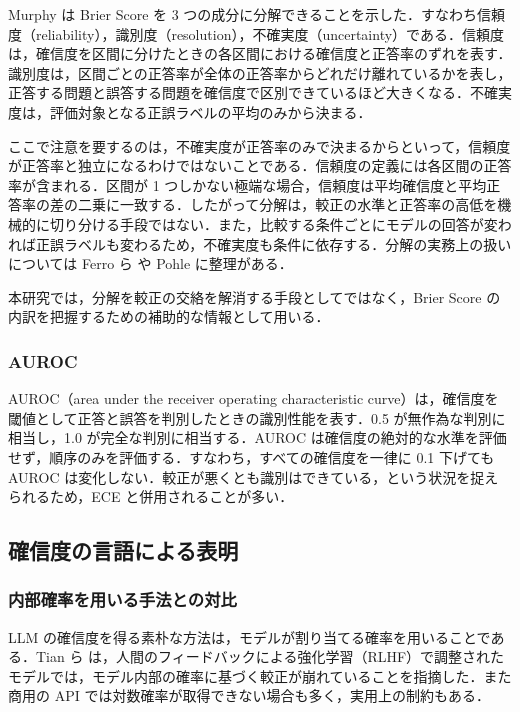 Murphy \cite{murphy1973partition} は Brier Score を 3 つの成分に分解できることを示した．すなわち信頼度（reliability），識別度（resolution），不確実度（uncertainty）である．信頼度は，確信度を区間に分けたときの各区間における確信度と正答率のずれを表す．識別度は，区間ごとの正答率が全体の正答率からどれだけ離れているかを表し，正答する問題と誤答する問題を確信度で区別できているほど大きくなる．不確実度は，評価対象となる正誤ラベルの平均のみから決まる．

ここで注意を要するのは，不確実度が正答率のみで決まるからといって，信頼度が正答率と独立になるわけではないことである．信頼度の定義には各区間の正答率が含まれる．区間が 1 つしかない極端な場合，信頼度は平均確信度と平均正答率の差の二乗に一致する．したがって分解は，較正の水準と正答率の高低を機械的に切り分ける手段ではない．また，比較する条件ごとにモデルの回答が変われば正誤ラベルも変わるため，不確実度も条件に依存する．分解の実務上の扱いについては Ferro ら \cite{ferro2012decomposition} や Pohle \cite{pohle2020murphy} に整理がある．

本研究では，分解を較正の交絡を解消する手段としてではなく，Brier Score の内訳を把握するための補助的な情報として用いる．

\subsubsection{AUROC}

AUROC（area under the receiver operating characteristic curve）は，確信度を閾値として正答と誤答を判別したときの識別性能を表す．0.5 が無作為な判別に相当し，1.0 が完全な判別に相当する．AUROC は確信度の絶対的な水準を評価せず，順序のみを評価する．すなわち，すべての確信度を一律に 0.1 下げても AUROC は変化しない．較正が悪くとも識別はできている，という状況を捉えられるため，ECE と併用されることが多い．

\subsection{確信度の言語による表明}

\subsubsection{内部確率を用いる手法との対比}

LLM の確信度を得る素朴な方法は，モデルが割り当てる確率を用いることである．Tian ら \cite{tian2023justask} は，人間のフィードバックによる強化学習（RLHF）で調整されたモデルでは，モデル内部の確率に基づく較正が崩れていることを指摘した．また商用の API では対数確率が取得できない場合も多く，実用上の制約もある．

